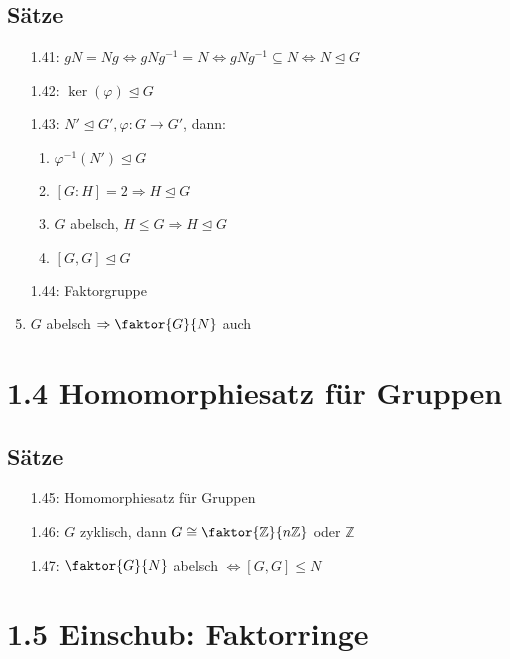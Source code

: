 \documentclass[twocolumn]{report}
\begin{document}
\subsection*{Sätze}
\begin{enumerate}[itemsep=0pt, topsep=0pt, parsep=0pt, partopsep=0pt, leftmargin=*]
    \item[1.41:] $gN = Ng \Leftrightarrow gNg^{-1} = N \Leftrightarrow gNg^{-1} \subseteq N \Leftrightarrow N \trianglelefteq G$
    \item[1.42:] $\ker(\varphi) \trianglelefteq G$
    \item[1.43:] $N' \trianglelefteq G', \varphi: G \to G'$, dann:
        \begin{enumerate}[itemsep=0pt, topsep=0pt, parsep=0pt, partopsep=0pt, leftmargin=*]
            \item $\varphi^{-1}(N') \trianglelefteq G$
            \item $[G:H] = 2 \Rightarrow H \trianglelefteq G$
            \item $G$ abelsch, $H \leq G \Rightarrow H \trianglelefteq G$
            \item $[G, G] \trianglelefteq G$
        \end{enumerate}
    \item[1.44:] Faktorgruppe
    \item $G$ abelsch $\Rightarrow \faktor{G}{N}$ auch
\end{enumerate}

\section*{1.4 Homomorphiesatz für Gruppen}
\subsection*{Sätze}
\begin{itemize}[itemsep=0pt, topsep=0pt, parsep=0pt, partopsep=0pt, leftmargin=*]
    \item[1.45:] Homomorphiesatz für Gruppen
    \item[1.46:] $G$ zyklisch, dann $G \cong \faktor{\mathbb{Z}}{n\mathbb{Z}}$ oder $\mathbb{Z}$
    \item[1.47:] $\faktor{G}{N}$ abelsch $\Leftrightarrow [G,G] \leq N$
\end{itemize}

\section*{1.5 Einschub: Faktorringe}
\end{document}
